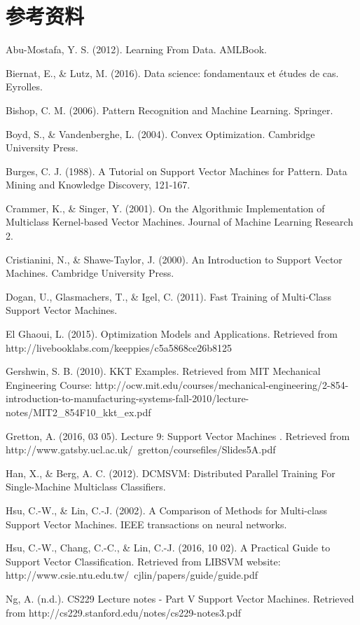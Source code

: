 \chapter{参考资料}

Abu-Mostafa, Y. S. (2012). Learning From Data. AMLBook.

Biernat, E., & Lutz, M. (2016). Data science: fondamentaux et études de cas. Eyrolles.

Bishop, C. M. (2006). Pattern Recognition and Machine Learning. Springer.

Boyd, S., & Vandenberghe, L. (2004). Convex Optimization. Cambridge University Press.

Burges, C. J. (1988). A Tutorial on Support Vector Machines for Pattern. Data Mining and Knowledge Discovery, 121-167.

Crammer, K., & Singer, Y. (2001). On the Algorithmic Implementation of Multiclass Kernel-based Vector Machines. Journal of Machine Learning Research 2.

Cristianini, N., & Shawe-Taylor, J. (2000). An Introduction to Support Vector Machines. Cambridge University Press.

Dogan, U., Glasmachers, T., & Igel, C. (2011). Fast Training of Multi-Class Support Vector Machines.

El Ghaoui, L. (2015). Optimization Models and Applications. Retrieved from http://livebooklabs.com/keeppies/c5a5868ce26b8125

Gershwin, S. B. (2010). KKT Examples. Retrieved from MIT Mechanical Engineering Course: http://ocw.mit.edu/courses/mechanical-engineering/2-854-introduction-to-manufacturing-systems-fall-2010/lecture-notes/MIT2_854F10_kkt_ex.pdf

Gretton, A. (2016, 03 05). Lecture 9: Support Vector Machines . Retrieved from http://www.gatsby.ucl.ac.uk/~gretton/coursefiles/Slides5A.pdf

Han, X., & Berg, A. C. (2012). DCMSVM: Distributed Parallel Training For Single-Machine Multiclass Classifiers.

Hsu, C.-W., & Lin, C.-J. (2002). A Comparison of Methods for Multi-class Support Vector Machines. IEEE transactions on neural networks.

Hsu, C.-W., Chang, C.-C., & Lin, C.-J. (2016, 10 02). A Practical Guide to Support Vector Classification. Retrieved from LIBSVM website: http://www.csie.ntu.edu.tw/~cjlin/papers/guide/guide.pdf

Ng, A. (n.d.). CS229 Lecture notes - Part V Support Vector Machines. Retrieved from http://cs229.stanford.edu/notes/cs229-notes3.pdf

